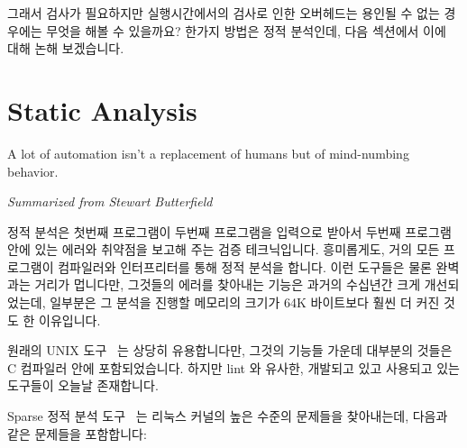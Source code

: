 그래서 검사가 필요하지만 실행시간에서의 검사로 인한 오버헤드는 용인될 수 없는
경우에는 무엇을 해볼 수 있을까요?
한가지 방법은 정적 분석인데, 다음 섹션에서 이에 대해 논해 보겠습니다.

\section{Static Analysis}
\label{sec:debugging:Static Analysis}
%
\epigraph{A lot of automation isn't a replacement of
	  humans but of mind-numbing behavior.}
	 {\emph{Summarized from Stewart Butterfield}}

정적 분석은 첫번째 프로그램이 두번째 프로그램을 입력으로 받아서 두번째 프로그램
안에 있는 에러와 취약점을 보고해 주는 검증 테크닉입니다.
흥미롭게도, 거의 모든 프로그램이 컴파일러와 인터프리터를 통해 정적 분석을
합니다.
이런 도구들은 물론 완벽과는 거리가 멉니다만, 그것들의 에러를 찾아내는 기능은
과거의 수십년간 크게 개선되었는데, 일부분은 그 분석을 진행할 메모리의 크기가
64K 바이트보다 훨씬 더 커진 것도 한 이유입니다.

원래의 UNIX  도구~\cite{StephenJohnson1977lint} 는 상당히
유용합니다만, 그것의 기능들 가운데 대부분의 것들은 C 컴파일러 안에
포함되었습니다.
하지만 lint 와 유사한, 개발되고 있고 사용되고 있는 도구들이 오늘날 존재합니다.

Sparse 정적 분석 도구~\cite{JonathanCorbet2004sparse} 는 리눅스 커널의 높은
수준의 문제들을 찾아내는데, 다음과 같은 문제들을 포함합니다:
\iffalse


